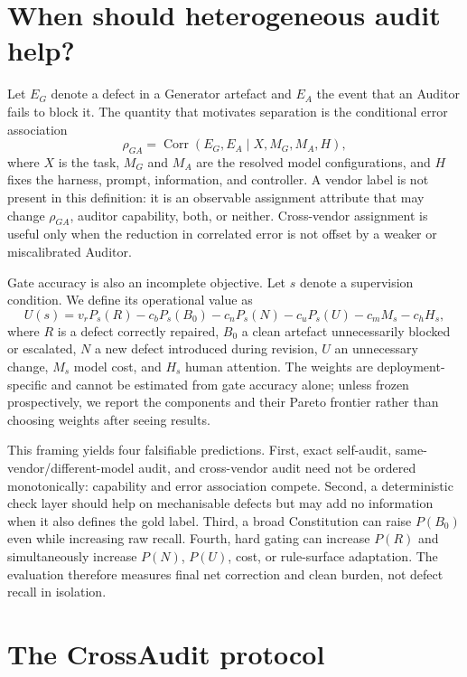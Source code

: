 \documentclass[11pt,letterpaper]{article}
\begin{document}
\section{When should heterogeneous audit help?}\label{sec:formal}

Let $E_G$ denote a defect in a Generator artefact and $E_A$ the event that an Auditor fails to block it. The quantity that motivates separation is the conditional error association
\begin{equation}
\rho_{GA}=\operatorname{Corr}(E_G,E_A\mid X,M_G,M_A,H),
\end{equation}
where $X$ is the task, $M_G$ and $M_A$ are the resolved model configurations, and $H$ fixes the harness, prompt, information, and controller. A vendor label is not present in this definition: it is an observable assignment attribute that may change $\rho_{GA}$, auditor capability, both, or neither. Cross-vendor assignment is useful only when the reduction in correlated error is not offset by a weaker or miscalibrated Auditor.

Gate accuracy is also an incomplete objective. Let $s$ denote a supervision condition. We define its operational value as
\begin{equation}
U(s)=v_r P_s(R)-c_bP_s(B_0)-c_nP_s(N)-c_uP_s(U)-c_mM_s-c_hH_s,
\label{eq:utility}
\end{equation}
where $R$ is a defect correctly repaired, $B_0$ a clean artefact unnecessarily blocked or escalated, $N$ a new defect introduced during revision, $U$ an unnecessary change, $M_s$ model cost, and $H_s$ human attention. The weights are deployment-specific and cannot be estimated from gate accuracy alone; unless frozen prospectively, we report the components and their Pareto frontier rather than choosing weights after seeing results.

This framing yields four falsifiable predictions. First, exact self-audit, same-vendor/different-model audit, and cross-vendor audit need not be ordered monotonically: capability and error association compete. Second, a deterministic check layer should help on mechanisable defects but may add no information when it also defines the gold label. Third, a broad Constitution can raise $P(B_0)$ even while increasing raw recall. Fourth, hard gating can increase $P(R)$ and simultaneously increase $P(N)$, $P(U)$, cost, or rule-surface adaptation. The evaluation therefore measures final net correction and clean burden, not defect recall in isolation.

\section{The CrossAudit protocol}\label{sec:protocol}
\end{document}
